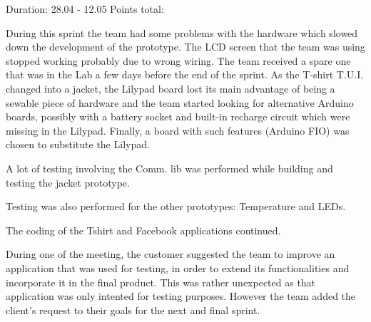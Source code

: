 Duration: 28.04 - 12.05
Points total:

During this sprint the team had some problems with the hardware which slowed
down the development of the prototype. The LCD screen that the team was using
stopped working probably due to wrong wiring. The team received a spare one that
was in the Lab a few days before the end of the sprint. As the T-shirt T.U.I.
changed into a jacket, the Lilypad board lost its main advantage of being a
sewable piece of hardware and the team started looking for alternative Arduino
boards, possibly with a battery socket and built-in recharge circuit which were
missing in the Lilypad. Finally, a board with such features (Arduino FIO) was
chosen to substitute the Lilypad.

A lot of testing involving the Comm. lib was performed while building and
testing the jacket prototype.

Testing was also performed for the other prototypes: Temperature and LEDs.

The coding of the Tshirt and Facebook applications continued.

During one of the meeting, the customer suggested the team to improve an
application that was used for testing, in order to extend its functionalities
and incorporate it in the final product. This was rather unexpected as that
application was only intented for testing purposes. However the team added the
client's request to their goals for the next and final sprint.




